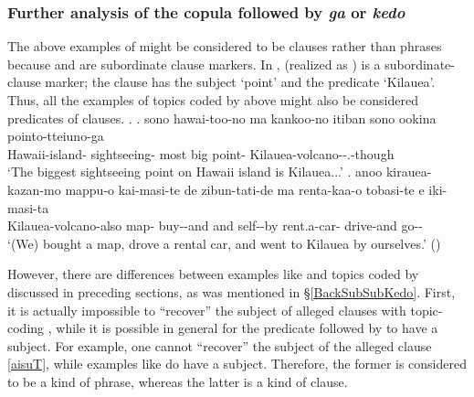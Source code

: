 
\subsubsection{Further analysis of the copula followed by \textit{ga} or \textit{kedo}}

The above examples of  might be considered to be clauses rather than phrases
because  and  are subordinate clause markers.
In \Next,
 (realized as ) is a subordinate-clause marker;
the clause has the subject  `point' and the predicate  `Kilauea'.
Thus, all the examples of topics coded by  above might also be considered predicates of  clauses.
%
\ex. \ag. sono hawai-too-no ma kankoo-no itiban sono ookina pointo-tteiuno-ga  \\
		 Hawaii-island-  sightseeing- most  big point- Kilauea-volcano--.-though \\
		`The biggest sightseeing point on Hawaii island is Kilauea...'
	\bg. anoo kirauea-kazan-mo mappu-o kai-masi-te de zibun-tati-de ma renta-kaa-o tobasi-te e iki-masi-ta \\
	 Kilauea-volcano-also map- buy--and and self--by  rent.a-car- drive-and  go-- \\
	`(We) bought a map, drove a rental car, and went to Kilauea by ourselves.'
		\hfill{()}

\newpage
However, there are differences between examples like \Last[a]
and topics coded by  discussed in preceding sections,
as was mentioned in \S \ref{BackSubSubKedo}.
First,
it is actually impossible to ``recover'' the subject of alleged  clauses with topic-coding ,
while it is possible in general for the  predicate followed by  to have a subject.
For example,
one cannot ``recover'' the subject of the alleged  clause \ref{aisuT},
while examples like \Last[a] do have a subject.
Therefore,
the former is considered to be a kind of phrase,
whereas the latter is a kind of clause.

